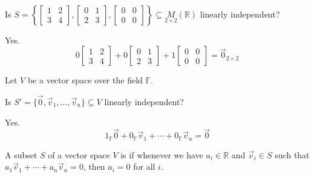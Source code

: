\documentclass[11pt,fleqn]{book} %
\begin{document}
\begin{example}
{~~~}

    Is $S = \left\{ \begin{bmatrix} 1&2\\3&4 \end{bmatrix}, \begin{bmatrix} 0&1\\2&3 \end{bmatrix}, \begin{bmatrix} 0&0\\0&0 \end{bmatrix} \right\} \subseteq \underset{2\times2}{M}(\mathbb{R})$ linearly independent? 
    
    {\color{lightblue} Yes. $$0 \begin{bmatrix} 1&2\\3&4 \end{bmatrix} + 0 \begin{bmatrix} 0&1\\2&3 \end{bmatrix} + 1 \begin{bmatrix} 0&0\\0&0 \end{bmatrix} = \vec{0}_{2\times2}$$ }
\end{example}

\begin{example}
    Let $V$ be a vector space over the field $\mathbb{F}$. 
    
    Is $S' = \{\vec{0}, \vec{v}_1, \dots, \vec{v}_n\} \subseteq V$ linearly independent? 
    
    {\color{lightblue} Yes. $$1_{\mathbb{F}}\vec{0} + 0_{\mathbb{F}}\vec{v}_1 + \cdots + 0_{\mathbb{F}}\vec{v}_n = \vec{0}$$ }
\end{example}

\setcounter{section}{4}
\setcounter{definitionT}{3}
\begin{definition}
    A subset $S$ of a vector space $V$ is  if whenever we have $a_i \in \mathbb{R}$ and $\vec{v}_i \in S$ such that $a_1\vec{v}_1 + \cdots + a_n\vec{v}_n = 0$, then $a_i = 0$ for all $i$.
\end{definition}
\setcounter{section}{5}
\end{document}
